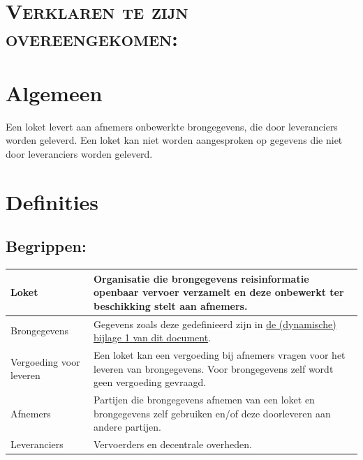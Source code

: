 \documentclass[10pt, a4paper]{article}
\begin{document}
\section*{\textsc{Verklaren te zijn overeengekomen:}}
\section{Algemeen}
Een loket levert aan afnemers onbewerkte brongegevens, die door leveranciers worden geleverd.
Een loket kan niet worden aangesproken op gegevens die niet door leveranciers worden geleverd.
\newpage

\section{Definities}

\subsection*{Begrippen:}
\begin{tabular}{l|p{10cm}}
Loket                       & Organisatie die brongegevens reisinformatie openbaar vervoer verzamelt en deze onbewerkt ter beschikking stelt aan afnemers. \\
\hline
	Brongegevens                & Gegevens zoals deze gedefinieerd zijn in \href{https://www.dova.nu/document/publicatiedocument-ndov-bijlage-1}{de (dynamische) bijlage 1 van dit document}. \\
\hline
Vergoeding voor leveren     & Een loket kan een vergoeding bij afnemers vragen voor het leveren van brongegevens. Voor brongegevens zelf wordt geen vergoeding gevraagd. \\
\hline
Afnemers                    & Partijen die brongegevens afnemen van een loket en brongegevens zelf gebruiken en/of deze doorleveren aan andere partijen. \\
\hline
Leveranciers                & Vervoerders en decentrale overheden. \\
\end{tabular}
\end{document}
